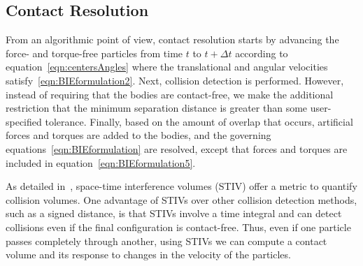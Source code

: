 \documentclass[preprint, 10pt]{elsarticle}
\begin{document}
\subsection{Contact Resolution}

From an algorithmic point of view, contact resolution starts by
advancing the force- and torque-free particles from time $t$ to $t +
\Delta t$ according to equation~\eqref{eqn:centersAngles} where the
translational and angular velocities satisfy~\eqref{eqn:BIEformulation2}.
Next, collision detection is performed.  However, instead of requiring
that the bodies are contact-free, we make the additional restriction
that the minimum separation distance is greater than some user-specified
tolerance.  Finally, based on the amount of overlap that occurs,
artificial forces and torques are added to the bodies, and the governing
equations~\eqref{eqn:BIEformulation} are resolved, except that forces
and torques are included in equation~\eqref{eqn:BIEformulation5}.  

As detailed in~\cite{Lu2017, Harmon2011}, space-time interference
volumes (STIV) offer a metric to quantify collision volumes. One
advantage of STIVs over other collision detection methods, such as a
signed distance, is that STIVs involve a time integral and can detect
collisions even if the final configuration is contact-free. Thus, even
if one particle passes completely through another, using STIVs we can
compute a contact volume and its response to changes in the velocity of
the particles.
\end{document}
